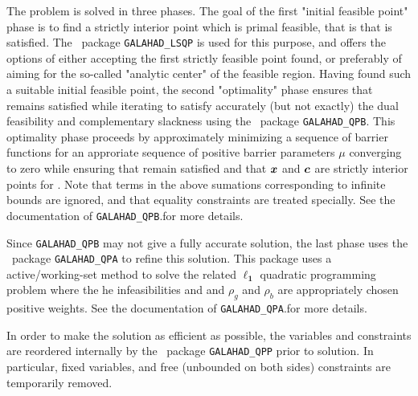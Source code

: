 \documentclass{galahad}
\begin{document}
The problem is solved in three phases. The goal of the first 
"initial feasible point" phase is
to find a strictly interior point which is primal feasible, that is that
 is satisfied. The \galahad\ package {\tt GALAHAD\_LSQP} 
is used for this 
purpose, and offers the options of either accepting the first 
strictly feasible point found, or preferably of aiming for the
so-called "analytic center" of the feasible region.
Having found such a suitable initial feasible point, the second "optimality"
phase ensures that  remains satisfied while iterating to satisfy 
accurately (but not exactly) the dual feasibility  
and complementary slackness 
using the \galahad\ package {\tt GALAHAD\_QPB}.
This optimality phase proceeds by approximately minimizing a 
sequence of barrier functions
for an approriate sequence of positive barrier parameters $\mu$ 
converging to zero
while ensuring that  remain satisfied and that 
${\bm{x}}$ and ${\bm{c}}$ are strictly interior points for . 
Note that terms in the above sumations corresponding to infinite bounds are
ignored, and that equality constraints are treated specially.
See the documentation of {\tt GALAHAD\_QPB}.for more details.

Since {\tt GALAHAD\_QPB} may not give a fully accurate solution, the
last phase uses the \galahad\ package {\tt GALAHAD\_QPA}
to refine this solution. This package uses a active/working-set method
to solve the related $\mathbf{\ell_1}$ quadratic programming problem
where the he infeasibilities
and
and $\rho_g$ and $\rho_b$ are appropriately chosen positive weights.
See the documentation of {\tt GALAHAD\_QPA}.for more details.

In order to make the solution as efficient as possible, the 
variables and constraints are reordered internally
by the \galahad\ package {\tt GALAHAD\_QPP} prior to solution. 
In particular, fixed variables, and 
free (unbounded on both sides) constraints are temporarily removed.
\end{document}
